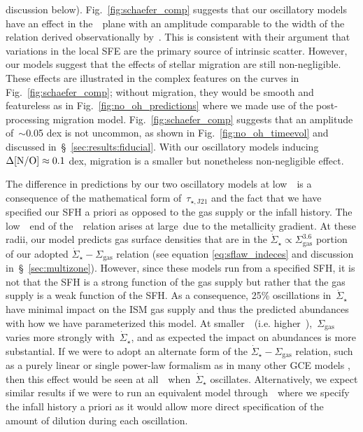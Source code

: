 \documentclass[ms.tex]{subfiles}
\begin{document}
discussion below).
Fig.~\ref{fig:schaefer_comp} suggests that our oscillatory models have an
effect in the~\ohno~plane with an amplitude comparable to the width of the
relation derived observationally by~\citet{Schaefer2020}.
This is consistent with their argument that variations in the local SFE are
the primary source of intrinsic scatter.
However, our models suggest that the effects of stellar migration are still
non-negligible.
These effects are illustrated in the complex features on the curves in
Fig.~\ref{fig:schaefer_comp}; without migration, they would be smooth and
featureless as in Fig.~\ref{fig:no_oh_predictions} where we made use of the
post-processing migration model.
Fig.~\ref{fig:schaefer_comp} suggests that an amplitude of~$\sim$0.05 dex is
not uncommon, as shown in Fig.~\ref{fig:no_oh_timeevol} and discussed
in~\S~\ref{sec:results:fiducial}.
With our oscillatory models inducing~$\Delta\text{[N/O]} \approx 0.1$ dex, migration is
a smaller but nonetheless non-negligible effect.
\par
The difference in predictions by our two oscillatory models at low~\oh~is a
consequence of the mathematical form of~$\tau_{\star,\text{J21}}$ and the fact
that we have specified our SFH a priori as opposed to the gas supply or the
infall history.
The low~\oh~end of the~\ohno~relation arises at large~\rgal due to the
metallicity gradient.
At these radii, our model predicts gas surface densities that are in the
$\dot{\Sigma}_\star \propto \Sigma_\text{gas}^{3.6}$ portion of our adopted
$\dot{\Sigma}_\star - \Sigma_\text{gas}$ relation (see equation
\ref{eq:sflaw_indeces} and discussion in~\S~\ref{sec:multizone}).
However, since these models run from a specified SFH, it is not that the SFH is
a strong function of the gas supply but rather that the gas supply is a weak
function of the SFH.
As a consequence, 25\% oscillations in~$\dot{\Sigma}_\star$ have minimal impact
on the ISM gas supply and thus the predicted abundances with how we have
parameterized this model.
At smaller~\rgal~(i.e. higher~\oh),~$\Sigma_\text{gas}$ varies more strongly
with~$\dot{\Sigma}_\star$, and as expected the impact on abundances is more
substantial.
If we were to adopt an alternate form of the
$\dot{\Sigma}_\star - \Sigma_\text{gas}$ relation, such as a purely linear or
single power-law formalism as in many other GCE models
\citep[e.g.][]{Spitoni2019, Spitoni2021, Grisoni2021}, then this effect would
be seen at all~\oh~when~$\dot{\Sigma}_\star$ oscillates.
Alternatively, we expect similar results if we were to run an equivalent model
through~\vice~where we specify the infall history a priori as it would allow
more direct specification of the amount of dilution during each oscillation.
\end{document}
